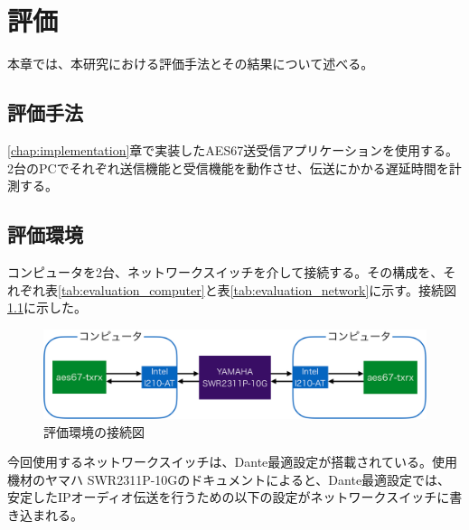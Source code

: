 \chapter{評価}
\label{chap:evaluation}

本章では、本研究における評価手法とその結果について述べる。

\section{評価手法}

\ref{chap:implementation}章で実装したAES67送受信アプリケーションを使用する。2台のPCでそれぞれ送信機能と受信機能を動作させ、伝送にかかる遅延時間を計測する。

\section{評価環境}

コンピュータを2台、ネットワークスイッチを介して接続する。その構成を、それぞれ表\ref{tab:evaluation_computer}と表\ref{tab:evaluation_network}に示す。接続図\ref{fig:evaluation_environment}に示した。

\begin{figure}[htbp]
  \centering
  \includegraphics[width=\linewidth]{img/evaluation_environment.pdf}
  \caption{評価環境の接続図}
  \label{fig:evaluation_environment}
\end{figure}

今回使用するネットワークスイッチは、Dante最適設定が搭載されている。使用機材のヤマハ SWR2311P-10Gのドキュメント\cite{yamaha-swr2311p-dante}によると、Dante最適設定では、安定したIPオーディオ伝送を行うための以下の設定がネットワークスイッチに書き込まれる。

